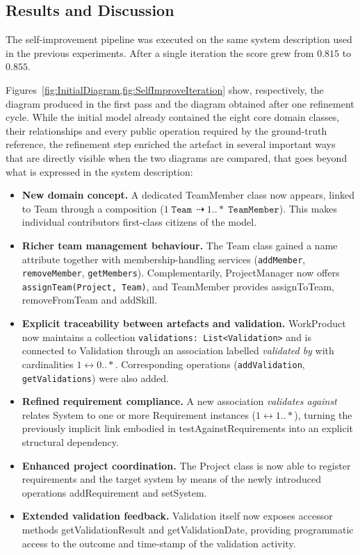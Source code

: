 \subsection{Results and Discussion}

The self-improvement pipeline was executed on the same system description used in the previous experiments.  
After a single iteration the score grew from \(\mathbf{0.815}\) to \(\mathbf{0.855}\).

Figures~\cref{fig:InitialDiagram,fig:SelfImproveIteration} show, respectively, the diagram produced in the first pass and the diagram obtained after one refinement cycle.  
While the initial model already contained the eight core domain classes, their relationships and every public operation required by the ground-truth reference, the refinement step enriched the artefact in several important ways that are directly visible when the two diagrams are compared, that goes beyond what is expressed in the system description:

\begin{itemize}
  \item \textbf{New domain concept.}  
        A dedicated TeamMember class now appears, linked to Team through a composition (\(1\;\texttt{Team}\;{\,\dashrightarrow}\;1..*\;\texttt{TeamMember}\)).  
        This makes individual contributors first-class citizens of the model.
  \item \textbf{Richer team management behaviour.}  
        The Team class gained a name attribute together with membership-handling services (\texttt{addMember}, \texttt{removeMember}, \texttt{getMembers}).  
        Complementarily, ProjectManager now offers \texttt{assignTeam(Project,\,Team)}, and TeamMember provides assignToTeam, removeFromTeam and addSkill.
  \item \textbf{Explicit traceability between artefacts and validation.}  
        WorkProduct now maintains a collection \texttt{validations: List<Validation>} and is connected to Validation through an association labelled \emph{validated by} with cardinalities \(1\leftrightarrow 0..*\).  
        Corresponding operations (\texttt{addValidation}, \texttt{getValidations}) were also added.
  \item \textbf{Refined requirement compliance.}  
        A new association \emph{validates against} relates System to one or more Requirement instances (\(1\leftrightarrow 1..*\)), turning the previously implicit link embodied in testAgainstRequirements into an explicit structural dependency.
  \item \textbf{Enhanced project coordination.}  
        The Project class is now able to register requirements and the target system by means of the newly introduced operations addRequirement and setSystem.
  \item \textbf{Extended validation feedback.}  
        Validation itself now exposes accessor methods getValidationResult and getValidationDate, providing programmatic access to the outcome and time-stamp of the validation activity.
\end{itemize}

